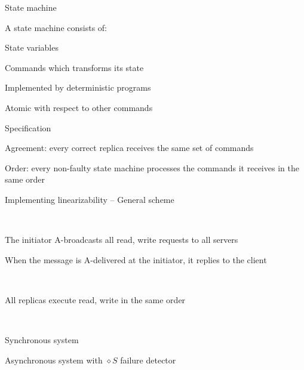 \begin{frame}{State machine}

\begin{definition}
A \alert{state machine} consists of:
\BI
\item \alert{State variables}
\item \alert{Commands} which transforms its state
  \BI
  \item Implemented by deterministic programs
  \item Atomic with respect to other commands
  \EI
\EI
\end{definition}

\begin{block}{Specification}
\BI
\item \alert{Agreement}: every correct replica receives the same set of
  commands
\item \alert{Order}: every non-faulty state machine processes the commands
  it receives in the same order
\EI
\end{block}

\end{frame}

\begin{frame}[t]{Implementing linearizability -- General scheme}

\\
\BI
\item The initiator A-broadcasts all read, write requests to all servers
\item When the message is A-delivered at the initiator, it replies to the client
\EI

\smallskip
{}\\
\BI
\item  All replicas execute read, write in the same order
\EI

\smallskip
{}\\
\BI
\item Synchronous system
\item Asynchronous system with $\diamond S$ failure detector
\EI

\end{frame}

